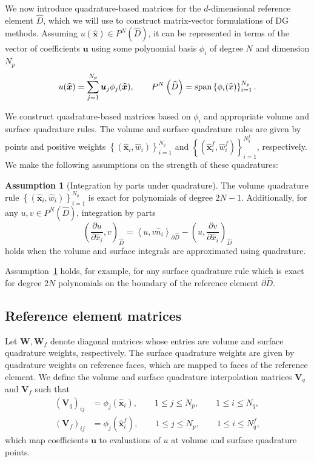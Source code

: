 \documentclass[preprint,10pt]{article}
\theoremstyle{definition}
\theoremstyle{lemma}
\theoremstyle{theorem}
\theoremstyle{assumption}
\newtheorem{assumption}{Assumption}
\renewcommand{\hat}{\widehat}
\newcommand{\pd}[2]{\frac{\partial#1}{\partial#2}}
\newcommand{\LRp}[1]{\left( #1 \right)}
\newcommand{\LRa}[1]{\left\langle #1 \right\rangle}
\newcommand{\LRc}[1]{\left\{ #1 \right\}}
\newcommand{\note}[1]{{\color{blue}{#1}}}
\begin{document}
{We now introduce quadrature-based matrices for the $d$-dimensional reference element $\widehat{D}$, which we will use to construct matrix-vector formulations of DG methods.   Assuming $u(\hat{\bm{x}}) \in P^N\LRp{\widehat{D}}$, it can be represented in terms of the vector of coefficients $\bm{u}$ using some polynomial basis $\phi_i$ of degree $N$ and dimension $N_p$ 
\[
  u(\hat{\bm{x}}) = \sum_{j=1}^{N_p}\bm{u}_j \phi_j(\widehat{\bm{x}}), \qquad P^N\LRp{\widehat{D}} = {\rm span}\LRc{\phi_i(\widehat{x})}_{i=1}^{N_p}.
\]

We construct quadrature-based matrices based on $\phi_i$ and appropriate volume and surface quadrature rules.  The volume and surface quadrature rules are given by points and positive weights $\LRc{(\hat{\bm{x}}_i, \hat{w}_i)}_{i=1}^{N_q}$ and $\LRc{(\hat{\bm{x}}^f_i, \hat{w}^f_i)}_{i=1}^{N^f_q}$, respectively.  We make the following assumptions on the strength of these quadratures: %
\begin{assumption}[Integration by parts under quadrature]
  The volume quadrature rule  $\LRc{(\hat{\bm{x}}_i, \hat{w}_i)}_{i=1}^{N_q}$ is exact for polynomials of degree $2N-1$.  Additionally, 
for any $u, v \in P^N\LRp{\hat{D}}$, integration by parts 
\[
  \LRp{\pd{u}{\hat{x}_i},v}_{\hat{D}} = \LRa{u,v\hat{n}_i}_{\partial \hat{D}} - \LRp{u,\pd{v}{\hat{x}_i}}_{\hat{D}}
\]
holds when the volume and surface integrals are approximated using quadrature.
\label{ass:quad}
\end{assumption}
Assumption~\ref{ass:quad} holds, for example, for any surface quadrature rule which is exact for degree $2N$ polynomials on the boundary of the reference element $\partial \hat{D}$.  


\subsection{Reference element matrices}
\label{sec:matrix}

Let $\bm{W}, \bm{W}_f$ denote diagonal matrices whose entries are volume and surface quadrature weights, respectively.  The surface quadrature weights are given by quadrature weights on reference faces, which are mapped to faces of the reference element.  We define the volume and surface quadrature interpolation matrices $\bm{V}_q$ and $\bm{V}_f$ such that
\begin{align}
\LRp{\bm{V}_q}_{ij} &= \phi_j(\hat{\bm{x}}_i), \qquad 1 \leq j \leq N_p, \qquad 1 \leq i \leq N_q, \nonumber\\
\LRp{\bm{V}_f}_{ij} &= \phi_j(\hat{\bm{x}}^f_i), \qquad 1 \leq j \leq N_p, \qquad 1 \leq i \leq N^f_q,\label{eq:qinterp}
\end{align}
which map coefficients $\bm{u}$ to evaluations of $u$ at volume and surface quadrature points.  

}
\end{document}
